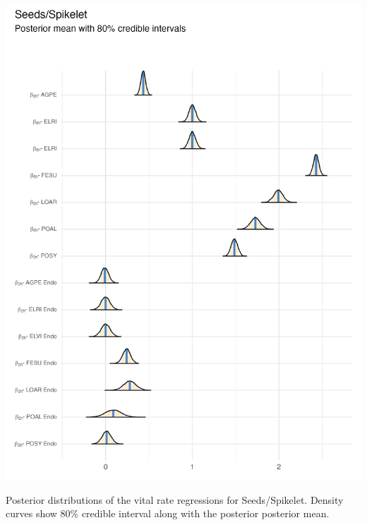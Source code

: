 \documentclass[lineno, sn-basic]{sn-jnl}%
\providecommand{\DIFaddbegin}{} %
\providecommand{\DIFaddend}{} %
\providecommand{\DIFdelbegin}{} %
\providecommand{\DIFdelend}{} %
\providecommand{\DIFaddbeginFL}{} %
\providecommand{\DIFaddendFL}{} %
\providecommand{\DIFdelbeginFL}{} %
\providecommand{\DIFdelendFL}{} %
\newcommand{\DIFscaledelfig}{0.5}
\newlength{\DIFdelgraphicswidth} %
\newlength{\DIFdelgraphicsheight} %
\newcommand{\DIFaddincludegraphics}[2][]{{\color{blue}\fbox{\DIFOincludegraphics[#1]{#2}}}} %
\newcommand{\DIFdelincludegraphics}[2][]{%
\sbox{\DIFdelgraphicsbox}{\DIFOincludegraphics[#1]{#2}}%
\settoboxwidth{\DIFdelgraphicswidth}{\DIFdelgraphicsbox} %
\settoboxtotalheight{\DIFdelgraphicsheight}{\DIFdelgraphicsbox} %
\scalebox{\DIFscaledelfig}{%
\parbox[b]{\DIFdelgraphicswidth}{\usebox{\DIFdelgraphicsbox}\\[-\baselineskip] \rule{\DIFdelgraphicswidth}{0em}}\llap{\resizebox{\DIFdelgraphicswidth}{\DIFdelgraphicsheight}{%
\setlength{\unitlength}{\DIFdelgraphicswidth}%
\begin{picture}(1,1)%
\thicklines\linethickness{2pt} %
{\color[rgb]{1,0,0}\put(0,0){\framebox(1,1){}}}%
{\color[rgb]{1,0,0}\put(0,0){\line( 1,1){1}}}%
{\color[rgb]{1,0,0}\put(0,1){\line(1,-1){1}}}%
\end{picture}%
}\hspace*{3pt}}} %
} %
\DeclareRobustCommand{\DIFaddbegin}{\DIFOaddbegin \let\includegraphics\DIFaddincludegraphics} %
\DeclareRobustCommand{\DIFaddend}{\DIFOaddend \let\includegraphics\DIFOincludegraphics} %
\DeclareRobustCommand{\DIFdelbegin}{\DIFOdelbegin \let\includegraphics\DIFdelincludegraphics} %
\DeclareRobustCommand{\DIFdelend}{\DIFOaddend \let\includegraphics\DIFOincludegraphics} %
\DeclareRobustCommand{\DIFaddbeginFL}{\DIFOaddbeginFL \let\includegraphics\DIFaddincludegraphics} %
\DeclareRobustCommand{\DIFaddendFL}{\DIFOaddendFL \let\includegraphics\DIFOincludegraphics} %
\DeclareRobustCommand{\DIFdelbeginFL}{\DIFOdelbeginFL \let\includegraphics\DIFdelincludegraphics} %
\DeclareRobustCommand{\DIFdelendFL}{\DIFOaddendFL \let\includegraphics\DIFOincludegraphics} %
\begin{document}
\DIFdelbegin %
\DIFdelendFL \DIFaddbeginFL \begin{myfigure}[H]
	\DIFaddendFL \centering
	\includegraphics[width = .8\linewidth]{seedmean_posteriors_plot.png}
	\DIFdelbeginFL %
\DIFdelendFL \DIFaddbeginFL \caption[Posterior distributions of the vital rate regressions for Seeds/Spikelet]{\DIFaddendFL Posterior distributions of the vital rate regressions for Seeds/Spikelet. Density curves show $80\%$ credible interval along with the posterior posterior mean.}
\DIFdelbeginFL %
\DIFdelend \DIFaddbegin \end{myfigure}
\DIFaddend 
\end{document}
